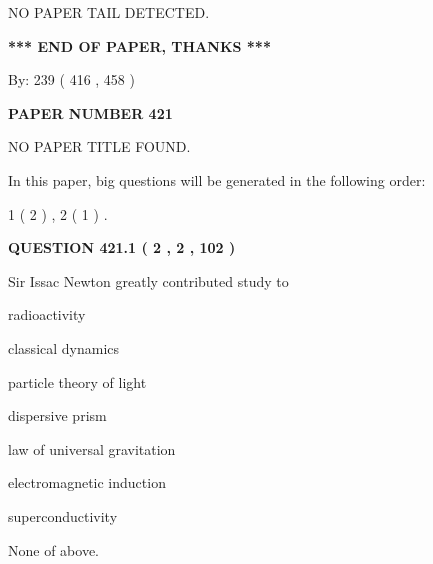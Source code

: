 \documentclass[12pt]{article}
\begin{document}
   
   
   
\vspace{2.0in} NO PAPER TAIL DETECTED.
   
   
   
   
\vspace{1.0in} 
{\textbf{\large{ *** END OF PAPER, THANKS *** }}} 
   
   
\hspace{1.0in} By: 
 239 ( 416 ,  458 )
   
   
   
   
\newpage 
\setcounter{page}{ 
   421001 } 
   
   
   
   
 {\textbf{ \Large{ PAPER NUMBER  421  }}}
   
   
\vspace{0.2in}
   
   
   
   
   
   
 NO PAPER TITLE FOUND.
   
   
   
\vspace{0.2in}
   
In this paper, big questions will be generated in the following order: 
   
   
   1 ( 2 )
 ,
   2 ( 1 )
 .
  
\vspace{0.2in}
  
{\textbf{\Large{QUESTION
421.1 
 ( 2 , 2 , 102 )
}}}
  
  
Sir Issac Newton greatly contributed study to
 
 
radioactivity
 
 
classical dynamics
 
 
particle theory of light
 
 
dispersive prism
 
 
law of universal gravitation
 
 
electromagnetic induction
 
 
superconductivity
 
 
 None of above.
 
 
\noindent{}
 
\end{document}
